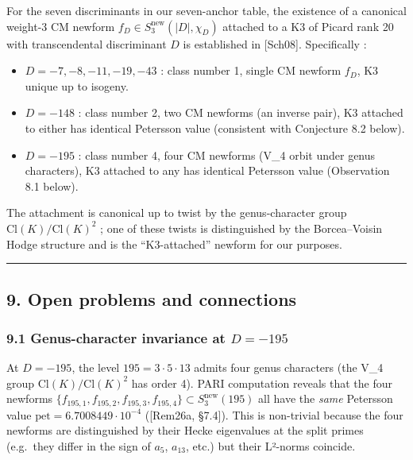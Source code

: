 \documentclass[
  11pt,
  a4paper,
]{amsart}
\providecommand{\tightlist}{\setlength{\itemsep}{0pt}\setlength{\parskip}{0pt}}
\providecommand{\tightlist}{%
  \setlength{\itemsep}{0pt}\setlength{\parskip}{0pt}}
\begin{document}
For the seven discriminants in our seven-anchor table, the existence of a canonical weight-3 CM newform \(f_D \in S_3^{\mathrm{new}}(|D|, \chi_D)\) attached to a K3 of Picard rank 20 with transcendental discriminant \(D\) is established in {[}Sch08{]}. Specifically :

\begin{itemize}
\tightlist
\item
  \(D = -7, -8, -11, -19, -43\) : class number 1, single CM newform \(f_D\), K3 unique up to isogeny.
\item
  \(D = -148\) : class number 2, two CM newforms (an inverse pair), K3 attached to either has identical Petersson value (consistent with Conjecture 8.2 below).
\item
  \(D = -195\) : class number 4, four CM newforms (V\_4 orbit under genus characters), K3 attached to any has identical Petersson value (Observation 8.1 below).
\end{itemize}

The attachment is canonical up to twist by the genus-character group \(\mathrm{Cl}(K)/\mathrm{Cl}(K)^{2}\) ; one of these twists is distinguished by the Borcea--Voisin Hodge structure and is the ``K3-attached'' newform for our purposes.

\begin{center}\rule{0.5\linewidth}{0.5pt}\end{center}

\hypertarget{open-problems-and-connections}{%
\subsection{9. Open problems and connections}\label{open-problems-and-connections}}

\hypertarget{genus-character-invariance-at-d--195}{%
\subsubsection{\texorpdfstring{9.1 Genus-character invariance at \(D = -195\)}{9.1 Genus-character invariance at D = -195}}\label{genus-character-invariance-at-d--195}}

At \(D = -195\), the level \(195 = 3\cdot 5\cdot 13\) admits four genus characters (the V\_4 group \(\mathrm{Cl}(K)/\mathrm{Cl}(K)^{2}\) has order 4). PARI computation reveals that the four newforms \(\{f_{195,1}, f_{195,2}, f_{195,3}, f_{195,4}\} \subset S_3^{\mathrm{new}}(195)\) all have the \emph{same} Petersson value \(\mathrm{pet} = 6.7008449\cdot 10^{-4}\) ({[}Rem26a, §7.4{]}). This is non-trivial because the four newforms are distinguished by their Hecke eigenvalues at the split primes (e.g.~they differ in the sign of \(a_5\), \(a_{13}\), etc.) but their L²-norms coincide.
\end{document}
